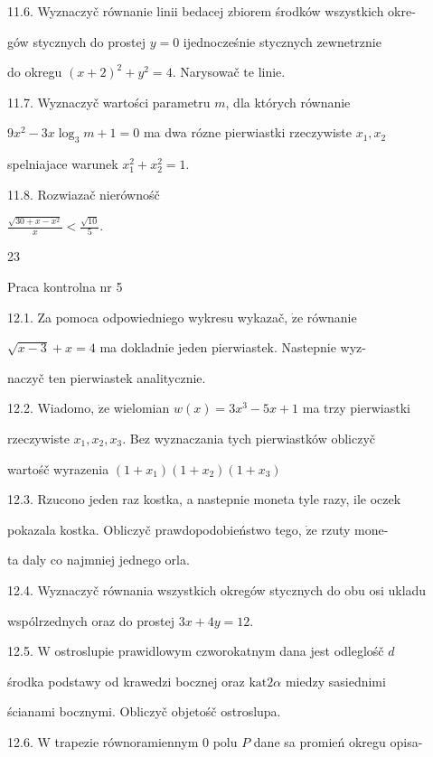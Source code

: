 \documentclass[a4paper,12pt]{article}
\begin{document}
11.6. Wyznaczyč równanie linii bedacej zbiorem środków wszystkich okre-

gów stycznych do prostej $y=0$ ijednocześnie stycznych zewnetrznie

do okregu $(x+2)^{2}+y^{2}=4$. Narysowač $\mathrm{t}\mathrm{e}$ linie.

11.7. Wyznaczyč wartości parametru $m$, dla których równanie

$9x^{2}-3x\log_{3}m+1=0$ ma dwa rózne pierwiastki rzeczywiste $x_{1}, x_{2}$

spelniajace warunek $x_{1}^{2}+x_{2}^{2}=1.$

11.8. Rozwiazač nierównośč

$\displaystyle \frac{\sqrt{30+x-x^{2}}}{x}<\frac{\sqrt{10}}{5}.$





23

Praca kontrolna nr 5

12.1. Za pomoca odpowiedniego wykresu wykazač, $\dot{\mathrm{z}}\mathrm{e}$ równanie

$\sqrt{x-3}+x = 4$ ma dokladnie jeden pierwiastek. Nastepnie wyz-

naczyč ten pierwiastek analitycznie.

12.2. Wiadomo, $\dot{\mathrm{z}}\mathrm{e}$ wielomian $w(x) = 3x^{3}-5x+1$ ma trzy pierwiastki

rzeczywiste $x_{1}, x_{2}, x_{3}$. Bez wyznaczania tych pierwiastków obliczyč

wartośč wyrazenia $(1+x_{1})(1+x_{2})(1+x_{3})$

12.3. Rzucono jeden raz kostka, a nastepnie moneta tyle razy, ile oczek

pokazala kostka. Obliczyč prawdopodobieństwo tego, $\dot{\mathrm{z}}\mathrm{e}$ rzuty mone-

ta daly co najmniej jednego orla.

12.4. Wyznaczyč równania wszystkich okregów stycznych do obu osi ukladu

wspólrzednych oraz do prostej $3x+4y=12.$

12.5. $\mathrm{W}$ ostroslupie prawidlowym czworokatnym dana jest odleglośč $d$

środka podstawy od krawedzi bocznej oraz $\mathrm{k}\mathrm{a}\mathrm{t}2\alpha$ miedzy sasiednimi

ścianami bocznymi. Obliczyč objetośč ostroslupa.

12.6. $\mathrm{W}$ trapezie równoramiennym $0$ polu $P$ dane sa promień okregu opisa-
\end{document}
